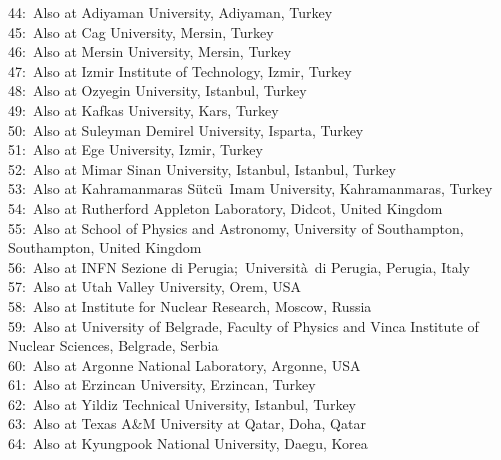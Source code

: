 $$44:~Also at Adiyaman University, Adiyaman, Turkey\\
45:~Also at Cag University, Mersin, Turkey\\
46:~Also at Mersin University, Mersin, Turkey\\
47:~Also at Izmir Institute of Technology, Izmir, Turkey\\
48:~Also at Ozyegin University, Istanbul, Turkey\\
49:~Also at Kafkas University, Kars, Turkey\\
50:~Also at Suleyman Demirel University, Isparta, Turkey\\
51:~Also at Ege University, Izmir, Turkey\\
52:~Also at Mimar Sinan University, Istanbul, Istanbul, Turkey\\
53:~Also at Kahramanmaras S\"{u}tc\"{u}~Imam University, Kahramanmaras, Turkey\\
54:~Also at Rutherford Appleton Laboratory, Didcot, United Kingdom\\
55:~Also at School of Physics and Astronomy, University of Southampton, Southampton, United Kingdom\\
56:~Also at INFN Sezione di Perugia;~Universit\`{a}~di Perugia, Perugia, Italy\\
57:~Also at Utah Valley University, Orem, USA\\
58:~Also at Institute for Nuclear Research, Moscow, Russia\\
59:~Also at University of Belgrade, Faculty of Physics and Vinca Institute of Nuclear Sciences, Belgrade, Serbia\\
60:~Also at Argonne National Laboratory, Argonne, USA\\
61:~Also at Erzincan University, Erzincan, Turkey\\
62:~Also at Yildiz Technical University, Istanbul, Turkey\\
63:~Also at Texas A\&M University at Qatar, Doha, Qatar\\
64:~Also at Kyungpook National University, Daegu, Korea\\


